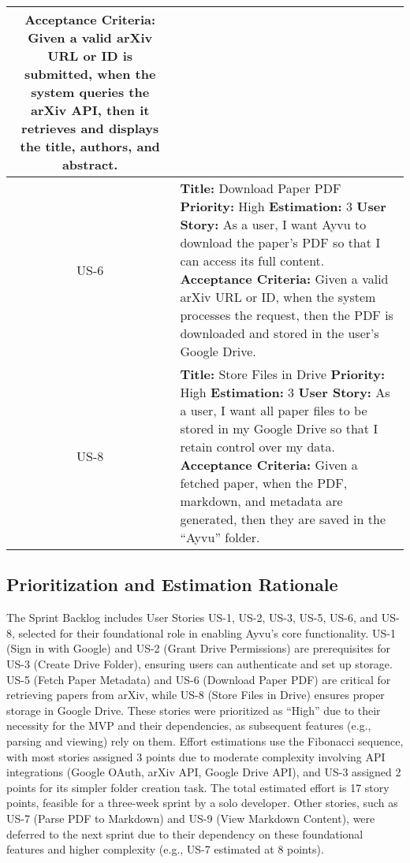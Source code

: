 \documentclass[12pt]{article}
\begin{document}
\begin{longtable}{|c|p{16cm}|}
  \textbf{Acceptance Criteria:} Given a valid arXiv URL or ID is submitted, when the system queries the arXiv API, then it retrieves and displays the title, authors, and abstract. \\
  \hline
  US-6 &
  \textbf{Title:} Download Paper PDF \newline
  \textbf{Priority:} High \newline
  \textbf{Estimation:} 3 \newline
  \textbf{User Story:} As a user, I want Ayvu to download the paper's PDF so that I can access its full content. \newline
  \textbf{Acceptance Criteria:} Given a valid arXiv URL or ID, when the system processes the request, then the PDF is downloaded and stored in the user's Google Drive. \\
  \hline
  US-8 &
  \textbf{Title:} Store Files in Drive \newline
  \textbf{Priority:} High \newline
  \textbf{Estimation:} 3 \newline
  \textbf{User Story:} As a user, I want all paper files to be stored in my Google Drive so that I retain control over my data. \newline
  \textbf{Acceptance Criteria:} Given a fetched paper, when the PDF, markdown, and metadata are generated, then they are saved in the ``Ayvu'' folder. \\
  \hline
\end{longtable}

\subsection{Prioritization and Estimation Rationale}
The Sprint Backlog includes User Stories US-1, US-2, US-3, US-5, US-6, and US-8, selected for their foundational role in enabling Ayvu's core functionality. US-1 (Sign in with Google) and US-2 (Grant Drive Permissions) are prerequisites for US-3 (Create Drive Folder), ensuring users can authenticate and set up storage. US-5 (Fetch Paper Metadata) and US-6 (Download Paper PDF) are critical for retrieving papers from arXiv, while US-8 (Store Files in Drive) ensures proper storage in Google Drive. These stories were prioritized as ``High'' due to their necessity for the MVP and their dependencies, as subsequent features (e.g., parsing and viewing) rely on them. Effort estimations use the Fibonacci sequence, with most stories assigned 3 points due to moderate complexity involving API integrations (Google OAuth, arXiv API, Google Drive API), and US-3 assigned 2 points for its simpler folder creation task. The total estimated effort is 17 story points, feasible for a three-week sprint by a solo developer. Other stories, such as US-7 (Parse PDF to Markdown) and US-9 (View Markdown Content), were deferred to the next sprint due to their dependency on these foundational features and higher complexity (e.g., US-7 estimated at 8 points).
\end{document}
